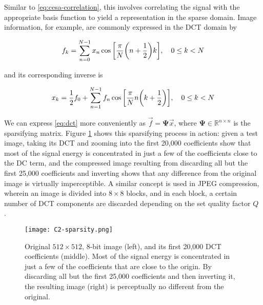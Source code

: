 \noindent Similar to \eqref{eq:cesa-correlation}, this involves correlating the signal with the appropriate basis function to yield a representation in the sparse domain. Image information, for example, are commonly expressed in the DCT domain by

\begin{equation}\label{eq:dct}
	f_k = \sum_{n=0}^{N-1} x_n \cos\qty[\frac{\pi}{N}\qty(n + \frac{1}{2})k] , \quad 0 \leq k < N
\end{equation}

\noindent and its corresponding inverse is

\begin{equation}\label{eq:idct}
	x_k = \frac{1}{2}f_0 + \sum_{n=1}^{N-1} f_n \cos\qty[\frac{\pi}{N}n \qty(k + \frac{1}{2})] , \quad 0 \leq k < N
\end{equation}

\noindent We can express \eqref{eq:dct} more conveniently as $\vec{f} = \bm\Psi \vec{x}$, where $\bm\Psi \in \mathbb{R}^{n \times n}$ is the sparsifying matrix. Figure \ref{fig:sparsity} shows this sparsifying process in action: given a test image, taking its DCT and zooming into the first 20,000 coefficients show that most of the signal energy is concentrated in just a few of the coefficients close to the DC term, and the compressed image resulting from discarding all but the first 25,000 coefficients and inverting shows that any difference from the original image is virtually imperceptible. A similar concept is used in JPEG compression, wherein an image is divided into $8 \times 8$ blocks, and in each block, a certain number of DCT components are discarded depending on the set quality factor $Q$ \cite{itu-jpeg}.

\begin{figure}[htb]
	\texttt{[image: C2-sparsity.png]}
	\caption{Original $512 \times 512$, 8-bit image (left), and its first 20,000 DCT coefficients (middle). Most of the signal energy is concentrated in just a few of the coefficients that are close to the origin. By discarding all but the first 25,000 coefficients and then inverting it, the resulting image (right) is perceptually no different from the original.}
	\label{fig:sparsity}
\end{figure}